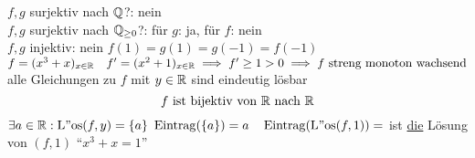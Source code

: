\documentclass{gadsescript}
\begin{document}
\begin{example}
	$ f, g $ surjektiv nach $ \mathbb{Q} $?: nein\\
	$ f, g $ surjektiv nach $ \mathbb{Q}_{\geq 0} $?: für $ g $: ja, für $ f $: nein\\
	$ f, g $ injektiv: nein $ f(1) = g(1) = g(-1) = f(-1) $\\
	$ f = ( x^3 + x )_{x \in \mathbb{R}} \quad f^{\prime} = ( x^2 + 1 )_{x \in \mathbb{R}} \implies f^{\prime} \geq 1 > 0 \implies f \text{ streng monoton wachsend} $\\
	alle Gleichungen zu $ f $ mit $ y \in \mathbb{R} $ sind eindeutig lösbar
	\[ f \text{ ist bijektiv von $ \mathbb{R} $ nach $ \mathbb{R} $} \]
	$ \exists a \in \mathbb{R} : \operatorname{L"os}(f, y) = \{ a \} $
	$ \operatorname{Eintrag}(\{ a \}) = a \quad \operatorname{Eintrag}(\operatorname{L"os}(f, 1)) = $ ist \underline{die} Lösung von $ (f, 1) $ ``$ x^3 + x = 1 $''\\[2pt]
\end{example}
\end{document}
